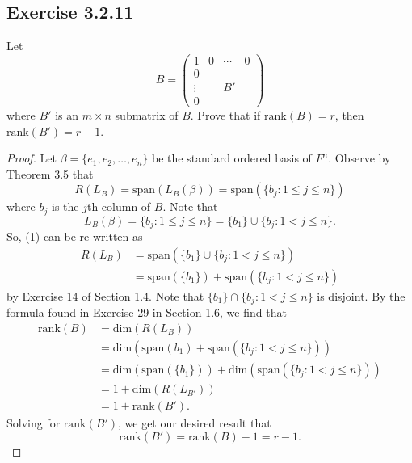 \subsection*{Exercise 3.2.11} Let
    \[  B = \begin{pmatrix} 
        1 & 0 & \cdots & 0  \\
        0  &  \\
        \vdots & & B' &   \\
        0 &    &
              \end{pmatrix} \]
    where \( B'  \) is an \( m \times n \) submatrix of \( B  \). Prove that if \( \text{rank}(B) = r  \), then \( \text{rank}(B') = r - 1  \).
    \begin{proof}
    Let \( \beta = \{ {e}_{1}, {e}_{2}, \dots, {e}_{n} \}  \) be the standard ordered basis of \( F^{n} \). Observe by Theorem 3.5 that
    \[  R({L}_{B}) = \text{span}({L}_{B}(\beta)) =  \text{span}(\{ {b}_{j} : 1 \leq j \leq n  \} ) \tag{1} \]
    where \( {b}_{j} \) is the \( j \)th column of \( B \). Note that
    \[  {L}_{B}(\beta) = \{ {b}_{j} : 1 \leq j \leq n  \} = \{ {b}_{1} \} \cup \{ {b}_{j} : 1 <  j \leq n  \}.   \]
    So, (1) can be re-written as
    \begin{align*}  
    R({L}_{B}) &= \text{span}(\{ {b}_{1} \} \cup \{ {b}_{j} : 1 < j \leq n \}) \\
               &=  \text{span}(\{ {b}_{1} \} ) + \text{span}(\{ {b}_{j} : 1 < j \leq  n \} )
\end{align*}
by Exercise 14 of Section 1.4. Note that \( \{ {b}_{1} \}  \cap \{ {b}_{j} : 1 < j \leq n \}  \) is disjoint. By the formula found in Exercise 29 in Section 1.6, we find that
\begin{align*}
    \text{rank}(B) &= \text{dim}(R({L}_{B})) \\
                   &= \text{dim}(\text{span}({b}_{1}) + \text{span}(\{ {b}_{j} : 1 < j \leq n  \} )) \\
                   &= \text{dim}(\text{span}(\{ {b}_{1} \})) + \text{dim}(\text{span}(\{ {b}_{j} : 1 < j \leq  n \})) \\ 
                   &= 1 + \text{dim}(R({L}_{B'})) \tag{Theorem 3.5} \\
                   &= 1 + \text{rank}(B').
\end{align*}
Solving for \( \text{rank}(B') \), we get our desired result that
\[  \text{rank}(B') = \text{rank}(B) - 1 = r - 1. \]
    \end{proof}

